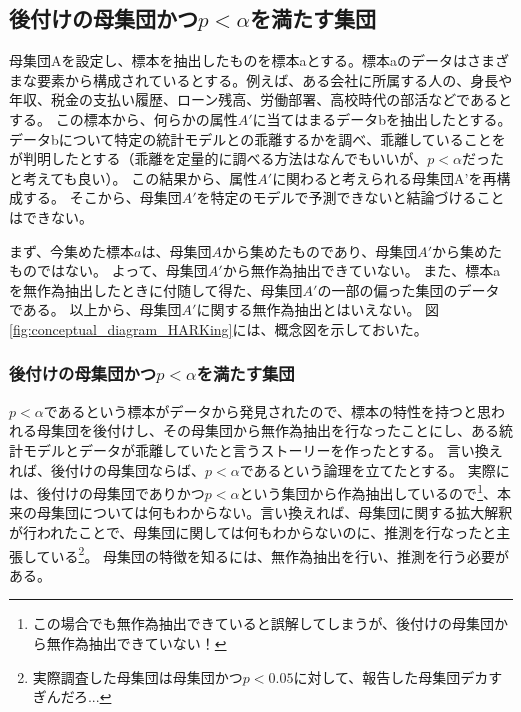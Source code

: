 \subsection{後付けの母集団かつ$p<\alpha$を満たす集団}
母集団Aを設定し、標本を抽出したものを標本aとする。標本aのデータはさまざまな要素から構成されているとする。例えば、ある会社に所属する人の、身長や年収、税金の支払い履歴、ローン残高、労働部署、高校時代の部活などであるとする。
この標本から、何らかの属性$A'$に当てはまるデータbを抽出したとする。
データbについて特定の統計モデルとの乖離するかを調べ、乖離していることをが判明したとする（乖離を定量的に調べる方法はなんでもいいが、$p<\alpha$だったと考えても良い）。
この結果から、属性$A'$に関わると考えられる母集団A'を再構成する。
そこから、母集団$A'$を特定のモデルで予測できないと結論づけることはできない。

まず、今集めた標本$a$は、母集団$A$から集めたものであり、母集団$A'$から集めたものではない。
よって、母集団$A'$から無作為抽出できていない。
また、標本aを無作為抽出したときに付随して得た、母集団$A'$の一部の偏った集団のデータである。
以上から、母集団$A'$に関する無作為抽出とはいえない。
図\ref{fig:conceptual_diagram_HARKing}には、概念図を示しておいた。

\subsubsection{後付けの母集団かつ$p<\alpha$を満たす集団}
$p<\alpha$であるという標本がデータから発見されたので、標本の特性を持つと思われる母集団を後付けし、その母集団から無作為抽出を行なったことにし、ある統計モデルとデータが乖離していたと言うストーリーを作ったとする。
言い換えれば、後付けの母集団ならば、$p<\alpha$であるという論理を立てたとする。
実際には、後付けの母集団でありかつ$p<\alpha$という集団から作為抽出しているので\footnote{この場合でも無作為抽出できていると誤解してしまうが、後付けの母集団から無作為抽出できていない！}、本来の母集団については何もわからない。言い換えれば、母集団に関する拡大解釈が行われたことで、母集団に関しては何もわからないのに、推測を行なったと主張している\footnote{実際調査した母集団は母集団かつ$p<0.05$に対して、報告した母集団デカすぎんだろ...}。
母集団の特徴を知るには、無作為抽出を行い、推測を行う必要がある。


